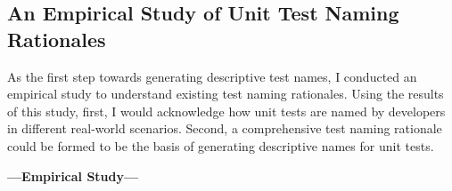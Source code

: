 \subsection{An Empirical Study of Unit Test Naming Rationales}
\label{sec:emp-study}

As the first step towards generating descriptive test names, I conducted an empirical study to understand existing test naming rationales.
%
Using the results of this study, first, I would acknowledge how unit tests are named by developers in different real-world scenarios.
%
Second, a comprehensive test naming rationale could be formed to be the basis of generating descriptive names for unit tests.

\textbf{---Empirical Study---}